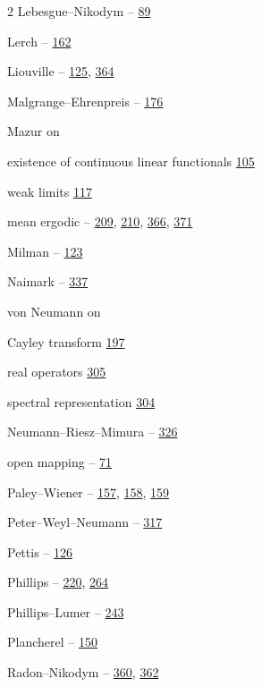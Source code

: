 \begin{multicols}{2}
\noindent Lebesgue--Nikodym -- \hyperlink{page.89}{89}\par
\noindent Lerch -- \hyperlink{page.162}{162}\par
\noindent Liouville -- \hyperlink{page.125}{125}, \hyperlink{page.364}{364}\par
\noindent Malgrange--Ehrenpreis -- \hyperlink{page.176}{176}\par
\noindent Mazur on\par
\hspace*{1.1em}existence of continuous linear functionals \hyperlink{page.105}{105}\par
\hspace*{1.1em}weak limits \hyperlink{page.117}{117}\par
\noindent mean ergodic -- \hyperlink{page.209}{209}, \hyperlink{page.210}{210}, \hyperlink{page.366}{366}, \hyperlink{page.371}{371}\par
\noindent Milman -- \hyperlink{page.123}{123}\par
\noindent Naimark -- \hyperlink{page.337}{337}\par
\noindent von Neumann on\par
\hspace*{1.1em}Cayley transform \hyperlink{page.197}{197}\par
\hspace*{1.1em}real operators \hyperlink{page.305}{305}\par
\hspace*{1.1em}spectral representation \hyperlink{page.304}{304}\par
\noindent Neumann--Riesz--Mimura -- \hyperlink{page.326}{326}\par
\noindent open mapping -- \hyperlink{page.71}{71}\par
\noindent Paley--Wiener -- \hyperlink{page.157}{157}, \hyperlink{page.158}{158}, \hyperlink{page.159}{159}\par
\noindent Peter--Weyl--Neumann -- \hyperlink{page.317}{317}\par
\noindent Pettis -- \hyperlink{page.126}{126}\par
\noindent Phillips -- \hyperlink{page.220}{220}, \hyperlink{page.264}{264}\par
\noindent Phillips--Lumer -- \hyperlink{page.243}{243}\par
\noindent Plancherel -- \hyperlink{page.150}{150}\par
\noindent Radon--Nikodym -- \hyperlink{page.360}{360}, \hyperlink{page.362}{362}\par

\end{multicols}
